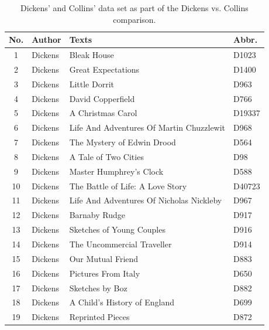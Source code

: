 \documentclass[a4paper,10pt,twoside,fleqn]{article}
\begin{document}
\begin{table}
\label{table:DC}
    \caption{Dickens' and Collins' data set as part of the Dickens vs. Collins comparison.}
     \begin{minipage}{.62\linewidth}
    \centering
      
      \label{table:Dickens-data}
\begin{tabular}{c l l l} \\\hline \hline
\textbf{No.} 	& \textbf{Author} 	& \textbf{Texts} 			& \textbf{Abbr.} \\ \hline
1   		& Dickens 		& Bleak House 				& D1023     \\
2   		& Dickens		& Great Expectations			& D1400      \\
3		& Dickens      		& Little Dorrit     			& D963       \\
4		& Dickens      		& David Copperfield     		& D766        \\
5		& Dickens      		& A Christmas Carol     		& D19337       \\
6   		& Dickens		& Life And Adventures Of Martin Chuzzlewit	& D968        \\
7		& Dickens		& The Mystery of Edwin Drood		& D564   \\
8		& Dickens      		& A Tale of Two Cities                  & D98      \\
9		& Dickens		& Master Humphrey's Clock		& D588           \\
10		& Dickens		& The Battle of Life: A Love Story      & D40723              \\
11		& Dickens		&Life And Adventures Of Nicholas Nickleby	& D967          \\  
12		& Dickens		&Barnaby Rudge      			& D917             \\
13		& Dickens		& Sketches of Young Couples		& D916        \\
14		& Dickens		& The Uncommercial Traveller            & D914           \\
15		& Dickens		& Our Mutual Friend			& D883           \\
16		& Dickens		& Pictures From Italy			& D650    \\
17		& Dickens		& Sketches by Boz			& D882      \\
18		& Dickens		& A Child's History of England       	& D699  \\
19		& Dickens		& Reprinted Pieces			& D872   \\

\end{tabular}
\end{minipage}
\end{table}
\end{document}
